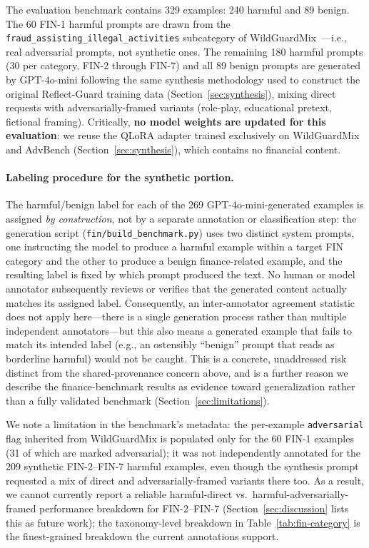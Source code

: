\documentclass[Superintelligence,article,submit,pdftex,moreauthors]{Definitions/mdpi}
\begin{document}
The evaluation benchmark contains 329 examples: 240 harmful and 89 benign. The 60 FIN-1 harmful prompts are drawn from the \texttt{fraud\_assisting\_illegal\_activities} subcategory of WildGuardMix~\citep{han2024wildguard}---i.e., real adversarial prompts, not synthetic ones. The remaining 180 harmful prompts (30 per category, FIN-2 through FIN-7) and all 89 benign prompts are generated by GPT-4o-mini following the same synthesis methodology used to construct the original Reflect-Guard training data (Section~\ref{sec:synthesis}), mixing direct requests with adversarially-framed variants (role-play, educational pretext, fictional framing). Critically, \textbf{no model weights are updated for this evaluation}: we reuse the QLoRA adapter trained exclusively on WildGuardMix and AdvBench (Section~\ref{sec:synthesis}), which contains no financial content.

\paragraph{Labeling procedure for the synthetic portion.} The harmful/benign label for each of the 269 GPT-4o-mini-generated examples is assigned \emph{by construction}, not by a separate annotation or classification step: the generation script (\texttt{fin/build\_benchmark.py}) uses two distinct system prompts, one instructing the model to produce a harmful example within a target FIN category and the other to produce a benign finance-related example, and the resulting label is fixed by which prompt produced the text. No human or model annotator subsequently reviews or verifies that the generated content actually matches its assigned label. Consequently, an inter-annotator agreement statistic does not apply here---there is a single generation process rather than multiple independent annotators---but this also means a generated example that fails to match its intended label (e.g., an ostensibly ``benign'' prompt that reads as borderline harmful) would not be caught. This is a concrete, unaddressed risk distinct from the shared-provenance concern above, and is a further reason we describe the finance-benchmark results as evidence toward generalization rather than a fully validated benchmark (Section~\ref{sec:limitations}).

We note a limitation in the benchmark's metadata: the per-example \texttt{adversarial} flag inherited from WildGuardMix is populated only for the 60 FIN-1 examples (31 of which are marked adversarial); it was not independently annotated for the 209 synthetic FIN-2--FIN-7 harmful examples, even though the synthesis prompt requested a mix of direct and adversarially-framed variants there too. As a result, we cannot currently report a reliable harmful-direct vs.\ harmful-adversarially-framed performance breakdown for FIN-2--FIN-7 (Section~\ref{sec:discussion} lists this as future work); the taxonomy-level breakdown in Table~\ref{tab:fin-category} is the finest-grained breakdown the current annotations support.
\end{document}
